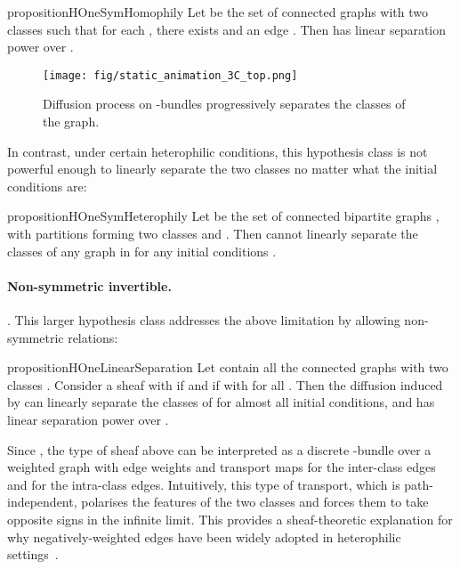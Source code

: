 \documentclass{article}
\begin{document}
\begin{restatable}{proposition}{HOneSymHomophily}\label{prop:h1_sym_homophily}
Let  be the set of connected graphs  with two classes  such that for each , there exists  and an edge . Then  has linear separation power over .  
\end{restatable}

\begin{figure}[t]
    \centering
    \texttt{[image: fig/static\_animation\_3C\_top.png]}
    \caption{Diffusion process on -bundles progressively separates the classes of the graph.}
    \vspace{-15pt} 
    \label{fig:d2_diff}
\end{figure}

In contrast, under certain heterophilic conditions, this hypothesis class is not powerful enough to linearly separate the two classes no matter what the initial conditions are: 

\begin{restatable}{proposition}{HOneSymHeterophily}\label{prop:h1_sym_heterophily}
Let  be the set of connected bipartite graphs , with partitions  forming two classes and . Then   cannot linearly separate the classes of any graph in  for any initial conditions .  
\end{restatable}


\paragraph*{Non-symmetric invertible.}
. This larger hypothesis class addresses the above limitation by allowing non-symmetric relations:

\begin{restatable}{proposition}{HOneLinearSeparation}\label{prop:h1_linear_separation}
Let  contain all the connected graphs  with two classes . Consider a sheaf  with  if  and  if  with  for all . Then the diffusion induced by  can linearly separate the classes of  for almost all initial conditions, and  has linear separation power over . 
\end{restatable}
\vspace{-5pt}
Since , the type of sheaf above can be interpreted as a discrete -bundle over a weighted graph with edge weights  and transport maps  for the inter-class edges and  for the intra-class edges. Intuitively, this type of transport, which is path-independent, polarises the features of the two classes and forces them to take opposite signs in the infinite limit. This provides a sheaf-theoretic explanation for why negatively-weighted edges have been widely adopted in heterophilic settings~\citep{yan2021two, chien2021adaptive, fagcn2021}. 
\end{document}
